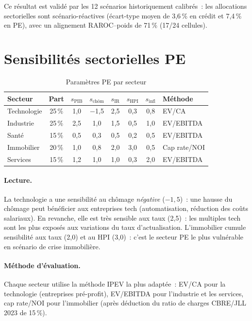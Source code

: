 \documentclass[12pt, a4paper, twoside, openright]{report}
\theoremstyle{definition}
\begin{document}
Ce résultat est validé par les 12 scénarios historiquement calibrés~: les allocations sectorielles sont scénario-réactives (écart-type moyen de 3{,}6\,\% en crédit et 7{,}4\,\% en PE), avec un alignement RAROC--poids de 71\,\% (17/24 cellules).

\section{Sensibilités sectorielles PE}
\label{sec:pe:sensibilites}

\begin{table}[htbp]
\centering
\caption{Paramètres PE par secteur}
\label{tab:pe-secteurs}
\small
\begin{tabular}{lccccccl}
\toprule
Secteur & Part & $s_{\text{PIB}}$ & $s_{\text{chôm}}$ & $s_{\text{IR}}$ & $s_{\text{HPI}}$ & $s_{\text{infl}}$ & Méthode \\
\midrule
Technologie & 25\,\% & 1{,}0 & $-$1{,}5 & 2{,}5 & 0{,}3 & 0{,}8 & EV/CA \\
Industrie & 25\,\% & 2{,}5 & 1{,}0 & 1{,}5 & 0{,}5 & 1{,}0 & EV/EBITDA \\
Santé & 15\,\% & 0{,}5 & 0{,}3 & 0{,}5 & 0{,}2 & 0{,}5 & EV/EBITDA \\
Immobilier & 20\,\% & 1{,}0 & 0{,}8 & 2{,}0 & 3{,}0 & 0{,}5 & Cap rate/NOI \\
Services & 15\,\% & 1{,}2 & 1{,}0 & 1{,}0 & 0{,}3 & 2{,}0 & EV/EBITDA \\
\bottomrule
\end{tabular}
\end{table}

\paragraph{Lecture.} La technologie a une sensibilité au chômage \emph{négative} ($-1{,}5$)~: une hausse du chômage peut bénéficier aux entreprises tech (automatisation, réduction des coûts salariaux). En revanche, elle est très sensible aux taux (2{,}5)~: les multiples tech sont les plus exposés aux variations du taux d'actualisation. L'immobilier cumule sensibilité aux taux (2{,}0) et au HPI (3{,}0)~: c'est le secteur PE le plus vulnérable en scénario de crise immobilière.

\paragraph{Méthode d'évaluation.} Chaque secteur utilise la méthode IPEV \citep{ipev2022} la plus adaptée~: EV/CA pour la technologie (entreprises pré-profit), EV/EBITDA pour l'industrie et les services, cap rate/NOI pour l'immobilier (après déduction du ratio de charges CBRE/JLL 2023 de 15\,\%).
\end{document}
